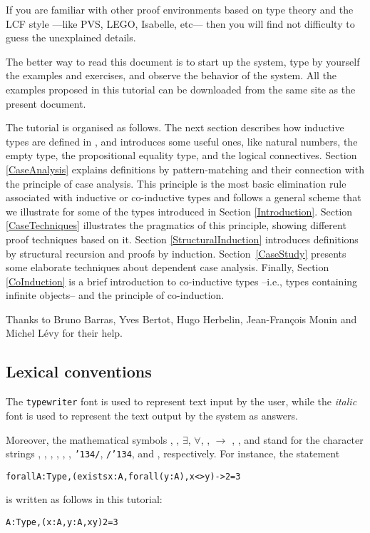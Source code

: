 \documentclass[11pt]{article}
\begin{document}
If you are familiar with other proof environments
based on type theory and the LCF style ---like PVS, LEGO, Isabelle,
etc--- then you will find not difficulty to guess the unexplained
details.

The better way to read this document is to start up the {\coq} system,
type by yourself the examples and exercises, and observe the
behavior of the system. All the examples proposed in this tutorial
can be downloaded from the same site as the present document.


The tutorial is organised as follows. The next section describes how
inductive types are defined in {\coq}, and introduces some useful ones,
like natural numbers, the empty type, the propositional equality type,
and the logical connectives. Section \ref{CaseAnalysis} explains
definitions by pattern-matching and their connection with the
principle of case analysis. This principle is the most basic
elimination rule associated with inductive or co-inductive types
 and follows a
general scheme that we illustrate for some of the types introduced in
Section \ref{Introduction}.  Section \ref{CaseTechniques} illustrates
the pragmatics of this principle, showing different proof techniques
based on it. Section \ref{StructuralInduction} introduces definitions
by structural recursion and proofs by induction.
Section~\ref{CaseStudy} presents some elaborate techniques
about dependent case analysis. Finally, Section
\ref{CoInduction} is a brief introduction to co-inductive types
--i.e., types containing infinite objects-- and the principle of
co-induction.


Thanks to  Bruno Barras, Yves Bertot, Hugo Herbelin, Jean-Fran\c{c}ois Monin
and Michel L\'evy for their help.

\subsection*{Lexical conventions}
The \texttt{typewriter} font is used to represent text
input by the user, while the \textit{italic} font is used to represent
the text output by the system as answers.


Moreover, the mathematical symbols \coqle{}, \coqdiff, \(\exists\),
\(\forall\), \arrow{}, $\rightarrow{}$ \coqor{}, \coqand{}, and \funarrow{}
stand for the character strings \citecoq{<=}, \citecoq{<>},
, , \citecoq{->}, \citecoq{<-},
\texttt{\char'134/}, \texttt{/\char'134}, and \citecoq{=>},
respectively.  For instance, the \coq{} statement
\begin{alltt}
forall A:Type,(exists x : A, forall (y:A), x <> y) -> 2 = 3
\end{alltt}
is written as follows in this tutorial:
\begin{alltt}
A:Type,(\exsym{}x:A, {\prodsym}y:A, x {\coqdiff} y) \arrow{} 2 = 3
\end{alltt}
\end{document}
